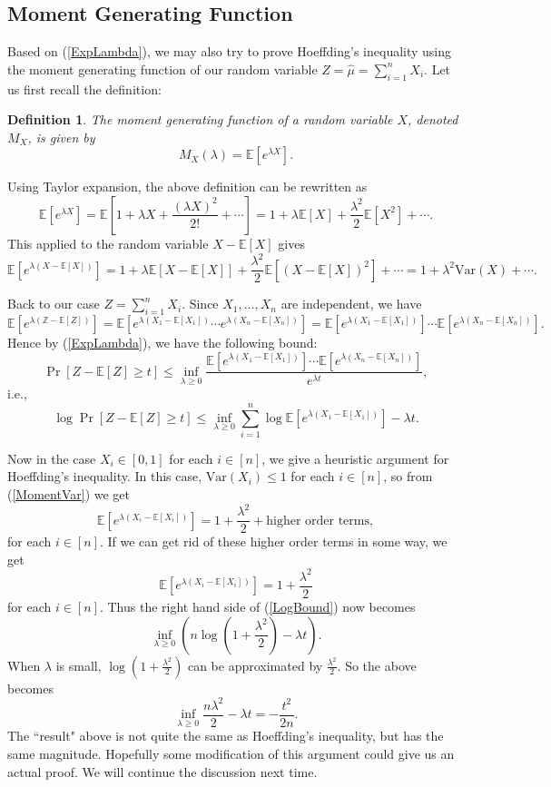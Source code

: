 \documentclass[11pt]{article}
\newtheorem{definition}[theorem]{Definition}
\newcommand{\E}{\mathbb{E}}
\newcommand{\Z}{\mathbb{Z}}
\newcommand{\Var}{\text{Var}}
\begin{document}
\subsection{Moment Generating Function}
Based on (\ref{ExpLambda}), we may also try to prove Hoeffding's inequality using the moment generating function of our random variable $Z = \hat \mu = \sum_{i=1}^n X_i$. Let us first recall the definition:

\begin{definition}
The \emph{moment generating function} of a random variable $X$, denoted $M_X$, is given by
$$  M_X(\lambda) = \E[e^{\lambda X}]. $$
\end{definition}

Using Taylor expansion, the above definition can be rewritten as
$$  \E[e^{\lambda X}] = \E\left[1 + \lambda X + \frac{(\lambda X)^2}{2!} + \cdots \right] = 1 + \lambda \E[X] + \frac{\lambda^2}{2}\E[X^2] + \cdots. $$
This applied to the random variable $X - \E[X]$ gives
\begin{equation}\label{MomentVar}
    \E[e^{\lambda(X - \E[X])}] = 1 + \lambda \E[X - \E[X]] + \frac{\lambda^2}{2}\E[(X - \E[X])^2] + \cdots = 1 + \lambda^2\Var(X) + \cdots. 
\end{equation}  

Back to our case $Z = \sum_{i=1}^n X_i$. Since $X_1, \dots, X_n$ are independent, we have
$$  \E[e^{\lambda(\Z - \E[Z])}] = \E[e^{\lambda(X_1 - \E[X_1])}\cdots e^{\lambda(X_n - \E[X_n])}] =  \E[e^{\lambda(X_1 - \E[X_1])}] \cdots \E[e^{\lambda(X_n - \E[X_n])}]. $$
Hence by (\ref{ExpLambda}), we have the following bound:
$$  \Pr[Z-\E[Z] \ge t] \le \inf_{\lambda \ge 0} \frac{\E[e^{\lambda(X_1 - \E[X_1])}] \cdots \E[e^{\lambda(X_n - \E[X_n])}]}{e^{\lambda t}}, $$
i.e.,
\begin{equation}\label{LogBound}
    \log \Pr[Z-\E[Z] \ge t] \le \inf_{\lambda \ge 0} \sum_{i = 1}^n \log \E[e^{\lambda(X_1 - \E[X_1])}] - \lambda t.
\end{equation}

Now in the case $X_i \in [0,1]$ for each $i \in [n]$, we give a heuristic argument for Hoeffding's inequality. In this case, $\Var(X_i) \le 1$ for each $i \in [n]$, so from (\ref{MomentVar}) we get
$$  \E[e^{\lambda(X_i - \E[X_i])}] = 1 + \frac{\lambda^2}{2} + \mbox{higher order terms},  $$
for each $i \in [n]$. If we can get rid of these higher order terms in some way, we get
$$  \E[e^{\lambda(X_i - \E[X_i])}] = 1 + \frac{\lambda^2}{2}    $$
for each $i \in [n]$. Thus the right hand side of (\ref{LogBound}) now becomes
$$  \inf_{\lambda \ge 0} \left(n \log \left(1 + \frac{\lambda^2}{2} \right) - \lambda t \right).$$
When $\lambda$ is small, $\log \left(1 + \frac{\lambda^2}{2}\right)$ can be approximated by $\frac{\lambda^2}{2}$. So the above becomes
$$  \inf_{\lambda \ge 0} \frac{n \lambda^2}{2} - \lambda t = -\frac{t^2}{2n}.$$
The ``result" above is not quite the same as Hoeffding's inequality, but has the same magnitude. Hopefully some modification of this argument could give us an actual proof. We will continue the discussion next time.




\nocite{*}

\end{document}
